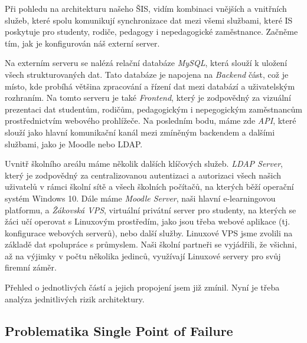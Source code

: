 \documentclass[FM,Proj]{tulthesis}
\begin{document}


Při pohledu na architekturu našeho ŠIS, vidím kombinaci vnějších a vnitřních služeb,
které spolu komunikují synchronizace dat mezi všemi službami, které IS poskytuje pro studenty,
rodiče, pedagogy i nepedagogické zaměstnance. Začněme tím, jak je konfigurován náš externí server.

Na externím serveru se nalézá relační databáze \textit{MySQL}, která slouží k uložení všech  
strukturovaných dat. Tato databáze je napojena na \textit{Backend} část, což je místo, kde probíhá
většina zpracování a řízení dat mezi databází a uživatelským rozhraním. Na tomto serveru je také
\textit{Frontend}, který je zodpovědný za vizuální prezentaci dat studentům, rodičům, pedagogickým i
nepegogickým zaměstnancům prostřednictvím webového prohlížeče. Na posledním bodu, máme zde \textit{API},
které slouží jako hlavní komunikační kanál mezi zmíněným backendem a dalšími službami,
jako je Moodle nebo LDAP.

Uvnitř školního areálu máme několik dalších klíčových služeb. \textit{LDAP Server}, který je
zodpovědný za centralizovanou autentizaci a autorizaci všech našich uživatelů v rámci školní
sítě a všech školních počítačů, na kterých běží operační systém Windows 10. Dále máme \textit{Moodle Server},
naši hlavní e-learningovou platformu, a \textit{Žákovská VPS}, 
virtuální privátní server pro studenty, na kterých se žáci učí operovat s Linuxovým prostředím,
jako jsou třeba webové aplikace (tj. konfigurace webových serverů), nebo další služby.
Linuxové VPS jsme zvolili na základě dat spolupráce s průmyslem. Naši školní partneři se vyjádřili,
že všichni, až na výjimky v počtu několika jedinců, využívají Linuxové servery pro svůj firemní záměr. 

Přehled o jednotlivých částí a jejich propojení jsem již zmínil. Nyní je třeba analýza jednitlivých rizik architektury.

\subsection*{Problematika Single Point of Failure}
\label{section:problematika-single-point-of-failure}
\end{document}
